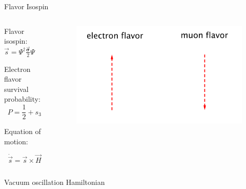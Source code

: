 \documentclass[9pt]{beamer}
\begin{document}
\begin{darkframes}
\begin{frame}{Flavor Isospin}
\begin{columns}[T]
\begin{column}{0.5\textwidth}
Flavor isospin: $\vec s = \Psi^{\dagger} \frac{\vec{\boldsymbol{\sigma}} }{2} \Psi $

\small
Electron flavor survival probability:
\vspace*{0pt}
\begin{equation*}
P = \frac{1}{2} + s_3
\end{equation*}


Equation of motion:

\begin{equation*}
\dot{\vec s} = \vec s \times \vec H
\end{equation*}




\end{column}%
\begin{column}{0.5\textwidth}

\begin{figure}
    \centering
    \includegraphics[width=\textwidth]{assets/flavor-isospin-illus}
\end{figure}

\end{column}
\end{columns}

\pause


\begin{columns}[T]
\begin{column}{0.5\textwidth}
\vspace{10pt}
Vacuum oscillation Hamiltonian


\end{column}
\end{columns}
\end{frame}
\end{darkframes}
\end{document}
